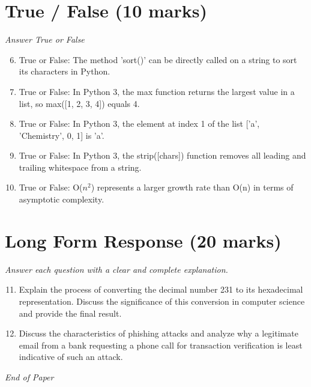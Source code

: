 \documentclass[12pt]{article}
\begin{document}
\section*{True / False (10 marks)}
\textit{Answer True or False}
\begin{enumerate}[label=\arabic*.]
\setcounter{enumi}{5}
\item True or False: The method 'sort()' can be directly called on a string to sort its characters in Python.
\item True or False: In Python 3, the max function returns the largest value in a list, so max([1, 2, 3, 4]) equals 4.
\item True or False: In Python 3, the element at index 1 of the list ['a', 'Chemistry', 0, 1] is 'a'.
\item True or False: In Python 3, the strip([chars]) function removes all leading and trailing whitespace from a string.
\item True or False: O($n^2$) represents a larger growth rate than O(n) in terms of asymptotic complexity.
\end{enumerate}

\section*{Long Form Response (20 marks)}
\textit{Answer each question with a clear and complete explanation.}
\begin{enumerate}[label=\arabic*.]
\setcounter{enumi}{10}
\item Explain the process of converting the decimal number 231 to its hexadecimal representation. Discuss the significance of this conversion in computer science and provide the final result.
\item Discuss the characteristics of phishing attacks and analyze why a legitimate email from a bank requesting a phone call for transaction verification is least indicative of such an attack.
\end{enumerate}

\vfill
\noindent\textit{End of Paper}
\end{document}
